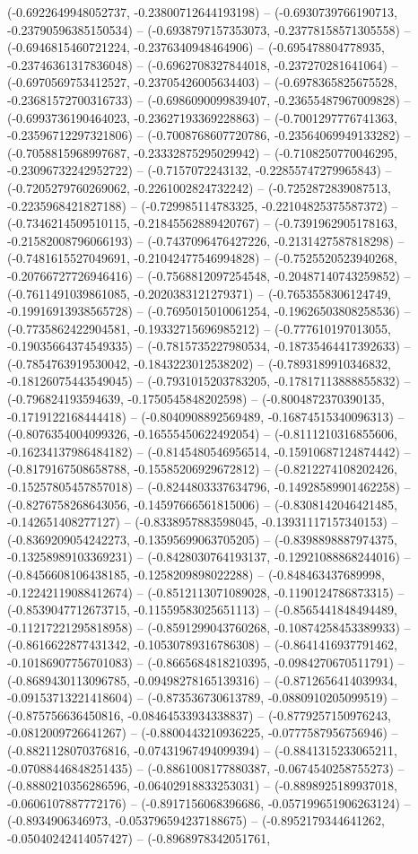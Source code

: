 (-0.6922649948052737, -0.23800712644193198) -- (-0.6930739766190713, -0.23790596385150534) -- (-0.6938797157353073, -0.23778158571305558) -- (-0.6946815460721224, -0.2376340948464906) -- (-0.695478804778935, -0.23746361317836048) -- (-0.6962708327844018, -0.237270281641064) -- (-0.6970569753412527, -0.23705426005634403) -- (-0.6978365825675528, -0.23681572700316733) -- (-0.6986090099839407, -0.23655487967009828) -- (-0.6993736190464023, -0.23627193369228863) -- (-0.7001297776741363, -0.23596712297321806) -- (-0.7008768607720786, -0.23564069949133282) -- (-0.7058815968997687, -0.23332875295029942) -- (-0.7108250770046295, -0.23096732242952722) -- (-0.7157072243132, -0.22855747279965843) -- (-0.7205279760269062, -0.2261002824732242) -- (-0.7252872839087513, -0.2235968421827188) -- (-0.729985114783325, -0.22104825375587372) -- (-0.7346214509510115, -0.21845562889420767) -- (-0.7391962905178163, -0.21582008796066193) -- (-0.7437096476427226, -0.2131427587818298) -- (-0.7481615527049691, -0.21042477546994828) -- (-0.7525520523940268, -0.20766727726946416) -- (-0.7568812097254548, -0.20487140743259852) -- (-0.7611491039861085, -0.2020383121279371) -- (-0.7653558306124749, -0.19916913938565728) -- (-0.7695015010061254, -0.19626503808258536) -- (-0.7735862422904581, -0.19332715696985212) -- (-0.777610197013055, -0.19035664374549335) -- (-0.7815735227980534, -0.18735464417392633) -- (-0.7854763919530042, -0.1843223012538202) -- (-0.7893189910346832, -0.18126075443549045) -- (-0.7931015203783205, -0.17817113888855832) -- (-0.796824193594639, -0.1750545848202598) -- (-0.8004872370390135, -0.1719122168444418) -- (-0.8040908892569489, -0.16874515340096313) -- (-0.8076354004099326, -0.16555450622492054) -- (-0.8111210316855606, -0.16234137986484182) -- (-0.8145480546956514, -0.15910687124874442) -- (-0.8179167508658788, -0.15585206929672812) -- (-0.8212274108202426, -0.15257805457857018) -- (-0.8244803337634796, -0.14928589901462258) -- (-0.8276758268643056, -0.14597666561815006) -- (-0.8308142046421485, -0.142651408277127) -- (-0.8338957883598045, -0.13931117157340153) -- (-0.8369209054242273, -0.13595699063705205) -- (-0.8398898887974375, -0.13258989103369231) -- (-0.8428030764193137, -0.12921088868244016) -- (-0.8456608106438185, -0.1258209898022288) -- (-0.848463437689998, -0.12242119088412674) -- (-0.8512113071089028, -0.1190124786873315) -- (-0.8539047712673715, -0.11559583025651113) -- (-0.8565441848494489, -0.11217221295818958) -- (-0.8591299043760268, -0.10874258453389933) -- (-0.8616622877431342, -0.10530789316786308) -- (-0.8641416937791462, -0.10186907756701083) -- (-0.8665684818210395, -0.0984270670511791) -- (-0.8689430113096785, -0.09498278165139316) -- (-0.8712656414039934, -0.09153713221418604) -- (-0.873536730613789, -0.0880910205099519) -- (-0.875756636450816, -0.08464533934338837) -- (-0.8779257150976243, -0.0812009726641267) -- (-0.8800443210936225, -0.0777587956756946) -- (-0.8821128070376816, -0.07431967494099394) -- (-0.8841315233065211, -0.07088446848251435) -- (-0.8861008177880387, -0.0674540258755273) -- (-0.8880210356286596, -0.06402918833253031) -- (-0.8898925189937018, -0.0606107887772176) -- (-0.8917156068396686, -0.057199651906263124) -- (-0.8934906346973, -0.053796594237188675) -- (-0.8952179344641262, -0.05040242414057427) -- (-0.8968978342051761, 